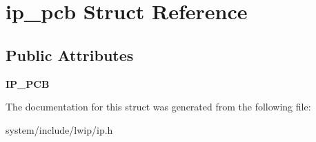 \hypertarget{structip__pcb}{}\section{ip\+\_\+pcb Struct Reference}
\label{structip__pcb}
\subsection*{Public Attributes}
\begin{DoxyCompactItemize}
\item 
\hypertarget{structip__pcb_aa8c53363aec905c3556c4ce197e24fc3}{}{\bfseries I\+P\+\_\+\+P\+C\+B}\label{structip__pcb_aa8c53363aec905c3556c4ce197e24fc3}

\end{DoxyCompactItemize}


The documentation for this struct was generated from the following file\+:\begin{DoxyCompactItemize}
\item 
system/include/lwip/ip.\+h\end{DoxyCompactItemize}
